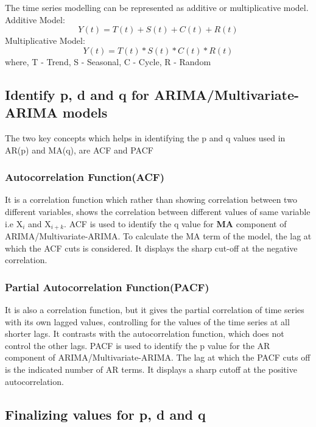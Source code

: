 \documentclass{article}
\begin{document}
The time series modelling can be represented as additive or multiplicative model.
Additive Model:
\begin{equation}
Y(t) = T(t) + S(t) + C(t) + R(t)
\end{equation}
Multiplicative Model:
\begin{equation}
Y(t) = T(t) * S(t) * C(t) * R(t)
\end{equation}
where, T - Trend, S - Seasonal, C - Cycle, R - Random

\subsection{Identify p, d and q for ARIMA/Multivariate-ARIMA models}
	
	The two key concepts which helps in identifying the p and q values used in AR(p) and MA(q), are ACF and PACF
	
	\subsubsection{Autocorrelation Function(ACF)}
	It is a correlation function which rather than showing correlation between two different variables, shows the correlation between different values of same variable i.e X$_{i}$ and X$_{i+k}$.\linebreak
	ACF is used to identify the q value for \textbf{MA} component of ARIMA/Multivariate-ARIMA. To calculate the MA term of the model, the lag at which the ACF cuts is considered. It displays the sharp cut-off at the negative correlation.

	
\subsubsection{Partial Autocorrelation Function(PACF)}

It is also a correlation function, but it gives the partial correlation of time series with its own lagged values, controlling for the values of the time series at all shorter lags. It contrasts with the autocorrelation function, which does not control the other lags.\linebreak
PACF is used to identify the p value for the AR component of ARIMA/Multivariate-ARIMA.
The lag at which the PACF cuts off is the indicated number of AR terms. It displays a sharp cutoff at the positive autocorrelation.

\subsection{Finalizing values for p, d and q}
\end{document}
